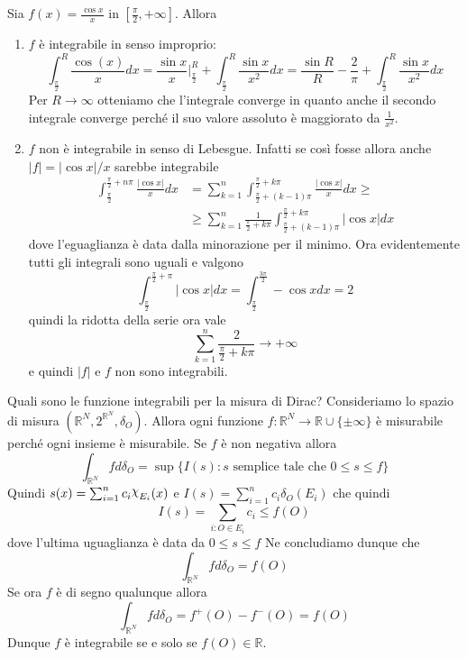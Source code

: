 \begin{example}
        Sia \(f(x) = \frac{\cos x}{x}\) in \([\frac{\pi}{2}, +\infty]\). Allora
\begin{enumerate}[label = \arabic*.]
    \item \(f\) è integrabile in senso improprio:
        \[
            \int_{\frac{\pi}{2}}^{R} \frac{\cos(x)}{x} dx = \frac{\sin x}{x}
            \Big|_{\frac{\pi}{2}}^{R} + \int_{\frac{\pi}{2}}^{R} \frac{\sin
            x}{x^{2}} dx = \frac{\sin R}{R} - \frac{2}{\pi} + \int_{\frac{\pi}{2}}^{R}
            \frac{\sin x}{x^{2}} dx
        \]
        Per \(R \to \infty\) otteniamo che l'integrale converge in quanto anche
        il secondo integrale converge perché il suo valore assoluto è maggiorato
        da \(\frac{1}{x^{2}}\).
    \item \(f\) non è integrabile in senso di Lebesgue. Infatti se così fosse
        allora anche \(|f| = |\cos x| / x\) sarebbe integrabile 
        \begin{align*}
            \int_{\frac{\pi}{2}}^{\frac{\pi}{2} + n\pi} \frac{|\cos x|}{x} dx &=
            \sum_{k=1}^{n} \int_{\frac{\pi}{2} + (k-1)\pi}^{\frac{\pi}{2} +
        k\pi} \frac{|\cos x|}{x} dx \ge \\ &\ge \sum_{k=1}^{n}
                \frac{1}{\frac{\pi}{2} + k\pi} \int_{\frac{\pi}{2} +
                (k-1)\pi}^{\frac{\pi}{2} + k\pi} |\cos x| dx
        \end{align*}
        dove l'eguaglianza è data dalla minorazione per il minimo.
        Ora evidentemente tutti gli integrali sono uguali e valgono
        \[
            \int_{\frac{\pi}{2}}^{\frac{\pi}{2} + \pi} |\cos x| dx =
            \int_{\frac{\pi}{2}} ^{\frac{3\pi}{2}} -\cos x  dx = 2
        \]
        quindi la ridotta della serie ora vale
        \[
            \sum_{k=1}^{n} \frac{2}{\frac{\pi}{2} + k\pi} \to +\infty   
        \]
        e quindi \(|f|\) e \(f\) non sono integrabili.
\end{enumerate}
\end{example}

\begin{example}
    Quali sono le funzione integrabili per la misura di Dirac? Consideriamo lo
    spazio di misura \((\mathbb{R}^{N}, 2^{\mathbb{R}^{N}}, \delta_O)\). Allora
    ogni funzione \(f : \mathbb{R}^{N} \to \mathbb{R} \cup \{\pm \infty\} \) è
    misurabile perché ogni insieme è misurabile. Se \(f\) è non negativa allora 
    \[
        \int_{\mathbb{R}^{N}} f d\delta_O = \sup \{ I(s) : s \text{ semplice
        tale che } 0\le s\le f\} 
    \]
    Quindi \(s(x) = \sum_{i=1}^{n} c_{i} \rchi_{E_{i}}(x)\) e \(I(s) =
    \sum_{i=1}^{n} c_{i} \delta_O(E_{i}) \) che quindi
    \[
        I(s) = \sum_{i:O \in E_{i}} c_{i} \le f(O)
    \]
    dove l'ultima uguaglianza è data da \(0 \le s\le f\) 
    Ne concludiamo dunque che 
    \[
        \int_{\mathbb{R}^{N}} f d\delta_O = f(O)
    \]
    Se ora \(f\) è di segno qualunque allora 
    \[
        \int_{\mathbb{R}^{N}} f d\delta_O = f^{+}(O) - f^{-}(O) = f(O)
    \]
    Dunque \(f\) è integrabile se e solo se \(f(O) \in \mathbb{R}\).
\end{example}

